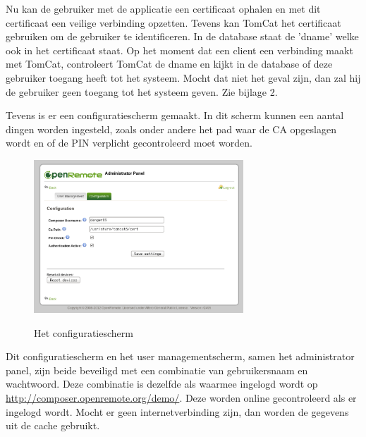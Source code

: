 \documentclass[]{article}
\begin{document}
Nu kan de gebruiker met de applicatie een certificaat ophalen en met dit
certificaat een veilige verbinding opzetten. Tevens kan TomCat het certificaat
gebruiken om de gebruiker te identificeren. In de database staat de 'dname'
welke ook in het certificaat staat. Op het moment dat een client een verbinding
maakt met TomCat, controleert TomCat de dname en kijkt in de database of deze
gebruiker toegang heeft tot het systeem. Mocht dat niet het geval zijn, dan zal hij
de gebruiker geen toegang tot het systeem geven.
Zie bijlage 2.

Tevens is er een configuratiescherm gemaakt. In dit scherm kunnen een aantal dingen worden
ingesteld, zoals onder andere het pad waar de CA opgeslagen wordt en of de PIN
verplicht gecontroleerd moet worden.

\begin{figure}[h!]
  \centering
    \includegraphics[width=0.7\textwidth,keepaspectratio]{adminv2config.pdf}
  \label{adminv2config}
  \caption{Het configuratiescherm}
\end{figure}

Dit configuratiescherm en het user managementscherm, samen het administrator
panel, zijn beide beveiligd met
een combinatie van gebruikersnaam en wachtwoord. Deze combinatie is dezelfde als
waarmee ingelogd wordt op \url{http://composer.openremote.org/demo/}. 
Deze worden online gecontroleerd als er ingelogd wordt. Mocht er geen
internetverbinding zijn, dan worden de gegevens uit de cache gebruikt.
\end{document}
